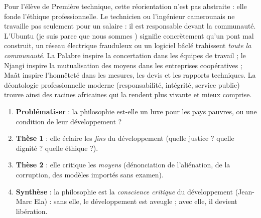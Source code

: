 \documentclass[11pt]{article}
\newcommand{\cle}[1]{{\popxbold\color{popdark}#1}}
\begin{document}
Pour l'élève de Première technique, cette réorientation n'est pas abstraite : elle fonde l'\cle{éthique professionnelle}. Le technicien ou l'ingénieur camerounais ne travaille pas seulement pour un salaire : il est responsable devant la communauté. L'Ubuntu (\og je suis parce que nous sommes \fg{}) signifie concrètement qu'un pont mal construit, un réseau électrique frauduleux ou un logiciel bâclé trahissent \emph{toute la communauté}. La Palabre inspire la concertation dans les équipes de travail ; le Njangi inspire la mutualisation des moyens dans les entreprises coopératives ; Maât inspire l'honnêteté dans les mesures, les devis et les rapports techniques. La déontologie professionnelle moderne (responsabilité, intégrité, service public) trouve ainsi des racines africaines qui la rendent plus vivante et mieux comprise.

\begin{methode}
\begin{enumerate}
\item \textbf{Problématiser} : la philosophie est-elle un luxe pour les pays pauvres, ou une condition de leur développement ?
\item \textbf{Thèse 1} : elle éclaire les \emph{fins} du développement (quelle justice ? quelle dignité ? quelle éthique ?).
\item \textbf{Thèse 2} : elle critique les \emph{moyens} (dénonciation de l'aliénation, de la corruption, des modèles importés sans examen).
\item \textbf{Synthèse} : la philosophie est la \emph{conscience critique} du développement (Jean-Marc Ela) : sans elle, le développement est aveugle ; avec elle, il devient libération.
\end{enumerate}
\end{methode}
\end{document}
